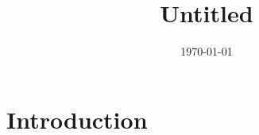 \documentclass{article}
\title{Untitled}
\author{}
\date{\today}
\begin{document}
\maketitle

\section{Introduction}



\end{document}
